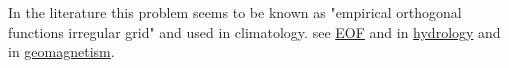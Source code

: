\documentclass[fleqn,11pt]{article}
\begin{document}
In the literature this problem seems to be known as "empirical orthogonal functions irregular grid" and used in climatology. see \href{https://scholar.google.nl/scholar?q=empirical+orthogonal+functions+irregular+grid&hl=nl&as_sdt=0&as_vis=1&oi=scholart}{EOF}
and in \href{https://link.springer.com/article/10.1007/BF01581422}{hydrology} and in \href{https://agupubs.onlinelibrary.wiley.com/doi/full/10.1002/2015JB012399}{geomagnetism}.





%
\end{document}
